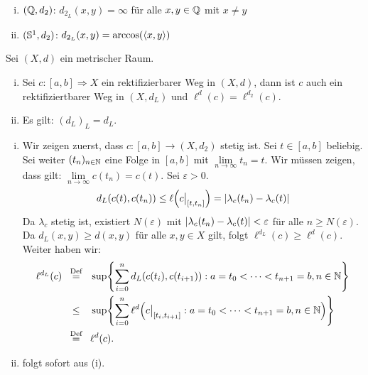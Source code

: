 \begin{beispiel}
\label{bsp:2.10}
	\begin{enumerate}[(i)]
		\item $(\mathbb{Q},d_2)$: $d_{2_L}(x,y) = \infty$ für alle $x,y \in \mathbb{Q}$ mit $x \neq y$
		\item $(\mathbb{S}^1,d_2)$: $d_{2_L}(x,y) = \arccos(\langle x,y\rangle)$
	\end{enumerate}
\end{beispiel}

\begin{proposition}
\label{prop:2.11}
	Sei $(X,d)$ ein metrischer Raum.
	\begin{enumerate}[(i)]
		\item Sei $c \colon [a,b] \Rightarrow X$ ein rektifizierbarer Weg in $(X,d)$, dann ist $c$ auch ein rektifiziertbarer Weg in $(X,d_L)$ und $\ell^d(c) = \ell^{d_2}(c)$.
		\item Es gilt: $(d_L)_L = d_L$.
	\end{enumerate}	
\end{proposition}

\begin{beweis}
	\begin{enumerate}[(i)]
		\item Wir zeigen zuerst, dass $c \colon [a,b] \rightarrow (X,d_2)$ stetig ist.
		Sei $t \in [a,b]$ beliebig.
		Sei weiter $(t_n)_{n \in \mathbb{N}}$ eine Folge in $[a,b]$ mit $\lim\limits_{n \rightarrow \infty} t_n = t$. Wir müssen zeigen, dass gilt: $\lim\limits_{n \rightarrow \infty} c(t_n) = c(t)$.
		Sei $\varepsilon > 0$.
		\[
			d_L(c(t),c(t_n)) \leq \ell\enbrace*{c \big|_{[t,t_n]}} = \abs{\lambda_c(t_n) - \lambda_c(t)}
		\]
		Da $\lambda_c$ stetig ist, existiert $N(\varepsilon)$ mit $\left\lvert\lambda_c(t_n) - \lambda_c(t)\right\rvert < \varepsilon$ für alle $n \geq N(\varepsilon)$. Da $d_L(x,y) \geq d(x,y)$ für alle $x,y \in X$ gilt, folgt $\ell^{d_L}(c) \geq \ell^d(c)$. Weiter haben wir:
		\begin{align*}
			\ell^{d_L}(c) &\stack{\text{Def}}{=} \sup \penbrace*{\sum\limits_{i=0}^{n} d_L(c(t_i),c(t_{i+1})) : a=t_0 < \dots < t_{n+1} = b, n\in \NN} \\
			&\stack{}{\leq} \sup \penbrace*{\sum\limits_{i=0}^{n} \ell^d \enbrace*{c\big|_{[t_i,t_{i+1}]} : a=t_0 < \dots < t_{n+1} = b, n\in \NN}} \\
			&\stack{\text{Def}}{=} \ell^d(c).
		\end{align*}
		\item folgt sofort aus (i).
	\end{enumerate}
\end{beweis}

